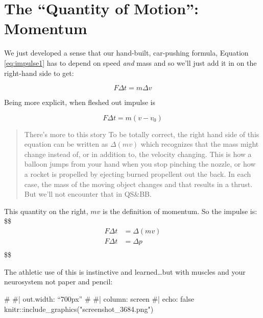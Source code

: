 \documentclass[
  letterpaper,
  DIV=11,
  numbers=noendperiod,
  oneside]{scrreprt}
\newenvironment{Shaded}{\begin{snugshade}}{\end{snugshade}}
\newcommand{\CommentTok}[1]{\textcolor[rgb]{0.37,0.37,0.37}{#1}}
\newcommand{\FunctionTok}[1]{\textcolor[rgb]{0.28,0.35,0.67}{#1}}
\newcommand{\NormalTok}[1]{\textcolor[rgb]{0.00,0.23,0.31}{#1}}
\newcommand{\SpecialCharTok}[1]{\textcolor[rgb]{0.37,0.37,0.37}{#1}}
\newcommand{\StringTok}[1]{\textcolor[rgb]{0.13,0.47,0.30}{#1}}
\begin{document}
\section{The ``Quantity of Motion'': Momentum}\label{sec-mechmomentum}

We just developed a sense that our hand-built, car-pushing formula,
Equation \eqref{eq:impulse1} has to depend on speed \emph{and} mass and
so we'll just add it in on the right-hand side to get:

\[
\begin{equation}
F\Delta t = m\Delta v  \label{impulse2}
\end{equation}
\]

Being more explicit, when fleshed out impulse is

\[
\begin{equation}
F\Delta t = m(v - v_0) \label{fullimpulse}
\end{equation}
\]

\begin{quote}
There's more to this story To be totally correct, the right hand side of
this equation can be written as \(\Delta (mv)\) which recognizes that
the mass might change instead of, or in addition to, the velocity
changing. This is how a balloon jumps from your hand when you stop
pinching the nozzle, or how a rocket is propelled by ejecting burned
propellent out the back. In each case, the mass of the moving object
changes and that results in a thrust. But we'll not encounter that in
QS\&BB.
\end{quote}

This quantity on the right, \(mv\) is the definition of momentum. So the
impulse is: \$\$ \begin{align}
F\Delta t &= \Delta (mv) \nonumber \\
F\Delta t &= \Delta p \label{momentumdef} \\

\end{align} \$\$

The athletic use of this is instinctive and learned\ldots but with
muscles and your neurosystem not paper and pencil:

\begin{Shaded}
\begin{Highlighting}[]
\CommentTok{\# \#| out.width: “700px”  }
\CommentTok{\# \#| column: screen}
\CommentTok{\#| echo: false}
\NormalTok{knitr}\SpecialCharTok{::}\FunctionTok{include\_graphics}\NormalTok{(}\StringTok{"screenshot\_3684.png"}\NormalTok{)}
\end{Highlighting}
\end{Shaded}
\end{document}
